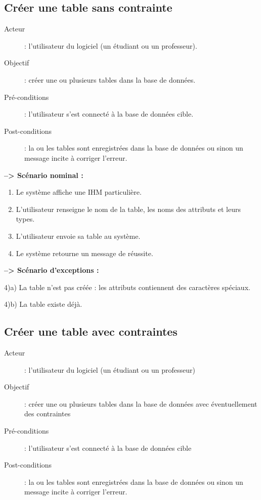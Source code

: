 \subsection{Créer une table sans contrainte}

\begin{description}
\item[Acteur] : l'utilisateur du logiciel (un étudiant ou un professeur).
\item[Objectif] : créer une ou plusieurs tables dans la base de données.
\item[Pré-conditions] : l'utilisateur s'est connecté à la base de données cible.
\item[Post-conditions] : la ou les tables sont enregistrées dans la base de données ou sinon un message incite à corriger l'erreur.
\end{description}

\textbf{--> Scénario nominal :}
\begin{enumerate}
\item Le système affiche une IHM particulière.
\item L'utilisateur renseigne le nom de la table, les noms des attributs et leurs types.
\item L'utilisateur envoie sa table au système.
\item Le système retourne un message de réussite.
\end{enumerate}

\textbf{--> Scénario d'exceptions :}
\begin{description}
\item 4)a) La table n'est pas créée : les attributs contiennent des caractères spéciaux.
\item 4)b) La table existe déjà.
\end{description}

\subsection{Créer une table avec contraintes}
\begin{description}
\item[Acteur] : l'utilisateur du logiciel (un étudiant ou un professeur)
\item[Objectif] : créer une ou plusieurs tables dans la base de données avec éventuellement des contraintes
\item[Pré-conditions] : l'utilisateur s'est connecté à la base de données cible
\item[Post-conditions] : la ou les tables sont enregistrées dans la base de données ou sinon un message incite à corriger l'erreur.
\end{description}

